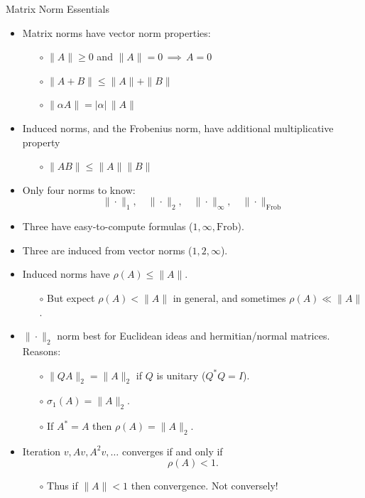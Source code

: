 \documentclass{amsart}
\newcommand{\alert}[1]{{\color{red} #1}}
\begin{document}
\Huge
\centerline{Matrix Norm Essentials}

\thispagestyle{empty}

\bigskip\bigskip\bigskip\bigskip\bigskip
\LARGE
\begin{itemize}
\setlength\itemsep{1em}
\item Matrix norms have vector norm \alert{properties}:
  \begin{itemize}
  \item[$\circ$] $\|A\| \ge 0$ and $\|A\|=0 \,\implies \,A=0$
  \item[$\circ$] $\|A+B\| \le \|A\| + \|B\|$
  \item[$\circ$] $\|\alpha A\| = |\alpha|\,\|A\|$
  \end{itemize}
\item Induced norms, and the Frobenius norm, have additional \alert{multiplicative} property
  \begin{itemize}
  \item[$\circ$] $\|A B\|\le \|A\|\|B\|$
  \end{itemize}
\item Only \alert{four} norms to know:
  $$\|\cdot\|_1, \quad \|\cdot\|_2, \quad \|\cdot\|_\infty, \quad \|\cdot\|_{\mathrm{Frob}}$$
\item Three have \alert{easy-to-compute formulas} ($1,\infty,\mathrm{Frob}$).
\item Three are \alert{induced} from vector norms ($1,2,\infty$).
\item Induced norms have $\rho(A)\le \|A\|$.
  \begin{itemize}
  \item[$\circ$] But \alert{expect} $\rho(A)<\|A\|$ in general, and sometimes $\rho(A)\ll\|A\|$.
  \end{itemize}
\item $\|\cdot\|_2$ norm best for \alert{Euclidean ideas} and \alert{hermitian/normal matrices}.  Reasons: 
  \begin{itemize}
  \item[$\circ$]  $\|QA\|_2 = \|A\|_2$ if $Q$ is unitary ($Q^* Q = I$).
  \item[$\circ$]  $\sigma_1(A) = \|A\|_2$.
  \item[$\circ$]  If $A^*=A$ then $\rho(A)=\|A\|_2$.
  \end{itemize}
\item \alert{Iteration} $v, Av, A^2v, \dots$ converges if and only if
    $$\rho(A)<1.$$
  \begin{itemize}
  \item[$\circ$] Thus \alert{if} $\|A\|<1$ \alert{then} convergence.  Not conversely!
  \end{itemize}
\end{itemize}
\end{document}
